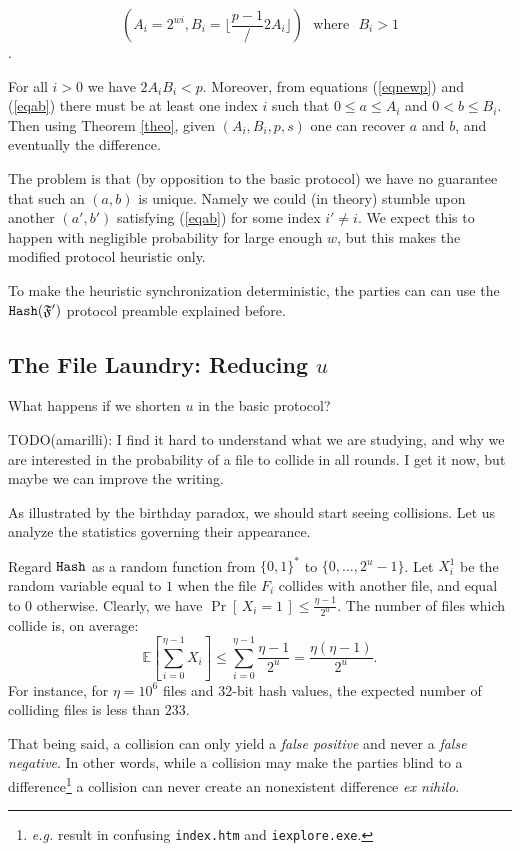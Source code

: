 \documentclass[11pt]{llncs}
\newcommand{\Prob}[1]{{\Pr\left[\,{#1}\,\right]}}
\newcommand{\EE}[1]{{\mathbb{E}\left[{#1}\right]}}
\begin{document}
$$(A_i=2^{wi},B_i=\lfloor \frac{p-1}/{2 A_i} \rfloor)\mbox{~~where~~}B_i>1$$.

For all $i>0$ we have $2 A_i B_i<p$. Moreover, from equations (\ref{eqnewp}) and (\ref{eqab}) there must be at least one index $i$ such that $0 \leq a \leq A_i$ and $0 <b \leq B_i$. Then using Theorem \ref{theo}, given $(A_i,B_i,p,s)$ one can recover $a$ and $b$, and eventually the difference.\smallskip

The problem is that (by opposition to the basic protocol) we have no guarantee that such an $(a,b)$ is unique. Namely we could (in theory) stumble upon another $(a',b')$ satisfying (\ref{eqab}) for some index $i' \neq i$. We expect this to happen with negligible probability for large enough $w$, but this makes the modified protocol heuristic only.\smallskip

To make the heuristic synchronization deterministic, the parties can can use the $\mbox{{\tt Hash}}(\mathfrak{F}')$ protocol preamble explained before.

\subsection{The File Laundry: Reducing $u$}

What happens if we shorten $u$ in the basic protocol?\smallskip

TODO(amarilli): I find it hard to understand what we are studying, and why we are interested in the probability of a file to collide in all rounds. I get it now, but maybe we can improve the writing.

As illustrated by the birthday paradox, we should start seeing collisions. Let us analyze the statistics governing their appearance.

Regard $\mbox{{\tt Hash}}$ as a random function from $\{0,1\}^*$ to $\{0,\dots,2^u-1\}$.
Let $X^1_i$ be the random variable equal to $1$ when the file $F_i$ collides with another file, and equal to $0$ otherwise.
Clearly, we have $\Prob{X_i = 1} \le \frac{\eta -1}{2^u}$.
The number of files which collide is, on average:
\[ \EE{\sum_{i=0}^{\eta-1} X_i} \le \sum_{i=0}^{\eta-1} \frac{\eta -1}{2^u} = \frac{\eta (\eta - 1)}{2^u}. \]
For instance, for $\eta=10^6$ files and 32-bit hash values, the expected number of colliding files is less than $233$.\smallskip

That being said, a collision can only yield a {\sl false positive} and never a {\sl false negative}. In other words, while a collision may make the parties blind to a difference\footnote{{\sl e.g.} result in confusing {\tt index.htm} and {\tt iexplore.exe}.} a collision can never create an nonexistent difference {\sl ex nihilo}.\smallskip
\end{document}
